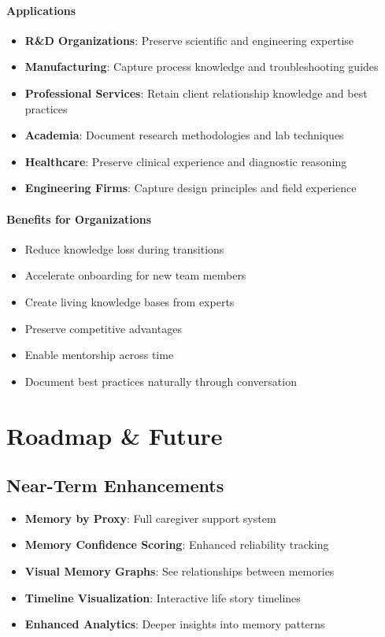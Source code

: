 \documentclass[11pt,letterpaper]{article}
\begin{document}
\paragraph{Applications}
\begin{itemize}[leftmargin=*]
    \item \textbf{R\&D Organizations}: Preserve scientific and engineering expertise
    \item \textbf{Manufacturing}: Capture process knowledge and troubleshooting guides
    \item \textbf{Professional Services}: Retain client relationship knowledge and best practices
    \item \textbf{Academia}: Document research methodologies and lab techniques
    \item \textbf{Healthcare}: Preserve clinical experience and diagnostic reasoning
    \item \textbf{Engineering Firms}: Capture design principles and field experience
\end{itemize}

\paragraph{Benefits for Organizations}
\begin{itemize}[leftmargin=*]
    \item Reduce knowledge loss during transitions
    \item Accelerate onboarding for new team members
    \item Create living knowledge bases from experts
    \item Preserve competitive advantages
    \item Enable mentorship across time
    \item Document best practices naturally through conversation
\end{itemize}

\newpage
\section{Roadmap \& Future}

\subsection{Near-Term Enhancements}
\begin{itemize}[leftmargin=*]
    \item \textbf{Memory by Proxy}: Full caregiver support system
    \item \textbf{Memory Confidence Scoring}: Enhanced reliability tracking
    \item \textbf{Visual Memory Graphs}: See relationships between memories
    \item \textbf{Timeline Visualization}: Interactive life story timelines
    \item \textbf{Enhanced Analytics}: Deeper insights into memory patterns
\end{itemize}
\end{document}

